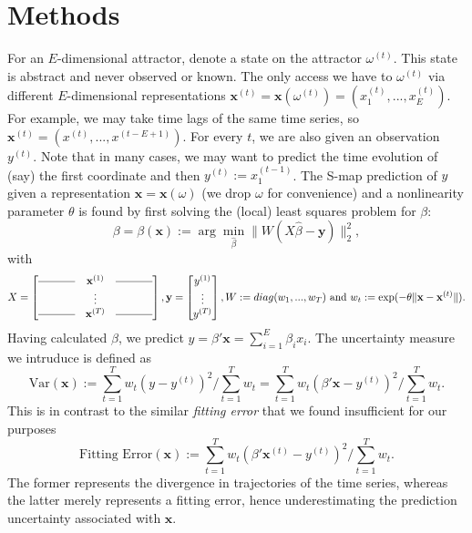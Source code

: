 \documentclass[fleqn,10pt]{wlscirep}
\newcommand{\un}{\text{Var}}
\newcommand{\x}{\mathbf{x}}
\begin{document}
\section{Methods}\label{section:methods}
For an $E$-dimensional attractor, denote a state on the attractor
$\omega^{(t)}$. This state is abstract and never observed or known. The
only access we have to $\omega^{(t)}$ via different $E$-dimensional
representations $\x^{(t)} = \x(\omega^{(t)}) =
(x_1^{(t)},...,x_E^{(t)})$. For example, we may take time lags of the
same time series, so $\x^{(t)} = (x^{(t)},...,x^{(t-E+1)})$. For every
$t$, we are also given an observation $y^{(t)}$. Note that in many
cases, we may want to predict the time evolution of (say) the first
coordinate and then $y^{(t)} := x_1^{(t-1)}$. The S-map prediction of
$y$ given a representation $\x = \x(\omega)$ (we drop $\omega$ for
convenience) and a nonlinearity parameter $\theta$ is found by first
solving the (local) least squares problem for $\beta$:
\begin{equation}
  \beta = \beta(\x) := \arg \min_{\hat{\beta}} \|W(X \hat{\beta} - \mathbf{y}) \|_2^2,
\end{equation}
with
\begin{equation*}
  X =
  \begin{bmatrix}
    \rule[.5ex]{3.5em}{0.4pt} & \x^{(1)} & \rule[.5ex]{3.5em}{0.4pt} \\
                              &  \vdots         &                 \\
    \rule[.5ex]{3.5em}{0.4pt} & \x^{(T)} & \rule[.5ex]{3.5em}{0.4pt} \\
  \end{bmatrix},
  \mathbf{y} =
  \begin{bmatrix}
    y^{(1)} \\
    \vdots \\
    y^{(T)}
  \end{bmatrix},
  W := diag( w_1,...,w_T)  \text{ and } w_t: =\exp( -\theta \| \x - \x^{(t)}\| ).
\end{equation*}
Having calculated $\beta$, we predict $y = \beta' \x = \sum_{i=1}^E \beta_i
x_i$. The uncertainty measure we intruduce is defined as
\begin{equation}\label{eq:uncertainty}
  \un (\x) := \sum_{t=1}^T w_t (y - y^{(t)})^2
  \bigg / \sum_{t=1}^T w_t = \sum_{t=1}^T w_t (\beta' \x -
  y^{(t)})^2 \bigg / \sum_{t=1}^T w_t.
\end{equation}
This is in contrast to the similar \emph{fitting error} that we found
insufficient for our purposes
\begin{equation*}
\text{Fitting Error}(\x) := \sum_{t=1}^T w_t ( \beta'
\x^{(t)} - y^{(t)})^2 \bigg / \sum_{t=1}^T w_t.
\end{equation*}
The former represents the divergence in trajectories of the time
series, whereas the latter merely represents a fitting error, hence
underestimating the prediction uncertainty associated with
$\x$.
\end{document}
